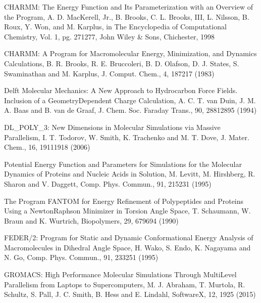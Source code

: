 \documentclass[letterpaper,11pt,english]{sphinxmanual}
\begin{document}
CHARMM: The Energy Function and Its Parameterization with an Overview of the Program, A. D. MacKerell, Jr., B. Brooks, C. L. Brooks, III, L. Nilsson, B. Roux, Y. Won, and M. Karplus, in The Encyclopedia of Computational Chemistry, Vol. 1, pg. 271\sphinxhyphen{}277, John Wiley \& Sons, Chichester, 1998

CHARMM: A Program for Macromolecular Energy, Minimization, and Dynamics Calculations, B. R. Brooks, R. E. Bruccoleri, B. D. Olafson, D. J. States, S. Swaminathan and M. Karplus, J. Comput. Chem., 4, 187\sphinxhyphen{}217 (1983)


Delft Molecular Mechanics: A New Approach to Hydrocarbon Force Fields. Inclusion of a Geometry\sphinxhyphen{}Dependent Charge Calculation, A. C. T. van Duin, J. M. A. Baas  and B. van de Graaf, J. Chem. Soc. Faraday Trans., 90, 2881\sphinxhyphen{}2895 (1994)


DL\_POLY\_3: New Dimensions in Molecular Simulations via Massive Parallelism, I. T. Todorov, W. Smith, K. Trachenko and M. T. Dove, J. Mater. Chem., 16, 1911\sphinxhyphen{}1918 (2006)


Potential Energy Function and Parameters for Simulations for the Molecular Dynamics of Proteins and Nucleic Acids in Solution, M. Levitt, M. Hirshberg, R. Sharon and V. Daggett, Comp. Phys. Commun., 91, 215\sphinxhyphen{}231 (1995)


The Program FANTOM for Energy Refinement of Polypeptides and Proteins Using a Newton\sphinxhyphen{}Raphson Minimizer in Torsion Angle Space, T. Schaumann, W. Braun and K. Wurtrich, Biopolymers, 29, 679\sphinxhyphen{}694 (1990)


FEDER/2: Program for Static and Dynamic Conformational Energy Analysis of Macro\sphinxhyphen{}molecules in Dihedral Angle Space, H. Wako, S. Endo, K. Nagayama and N. Go, Comp. Phys. Commun., 91, 233\sphinxhyphen{}251 (1995)


GROMACS: High Performance Molecular Simulations Through Multi\sphinxhyphen{}Level Parallelism from Laptops to Supercomputers, M. J. Abraham, T. Murtola, R. Schultz, S. Pall, J. C. Smith, B. Hess and E. Lindahl, SoftwareX, 1\sphinxhyphen{}2, 19\sphinxhyphen{}25 (2015)
\end{document}
